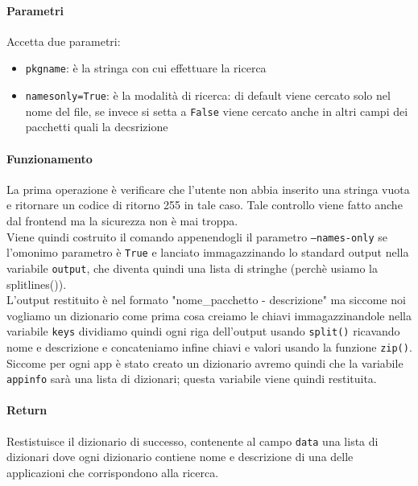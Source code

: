 \documentclass[11pt]{article}
\begin{document}
\paragraph{Parametri}
Accetta due parametri:
\begin{itemize}
	\item{\texttt{pkgname}: è la stringa con cui effettuare la ricerca}
	\item{\texttt{namesonly=True}: è la modalità di ricerca: di default viene cercato solo nel
		nome del file, se invece si setta a \texttt{False} viene cercato anche in altri campi
		dei pacchetti quali la decsrizione}
\end{itemize}
\paragraph{Funzionamento}
La prima operazione è verificare che l'utente non abbia inserito una stringa vuota e ritornare un codice di ritorno 255
in tale caso. Tale controllo viene fatto anche dal frontend ma la sicurezza non è mai troppa.\\
Viene quindi costruito il comando appenendogli il parametro \texttt{--names-only} se l'omonimo parametro è \texttt{True}
e lanciato immagazzinando lo standard output nella variabile \texttt{output}, che diventa quindi una lista di stringhe
(perchè usiamo la splitlines()).\\
L'output restituito è nel formato "nome\_pacchetto - descrizione" ma siccome noi vogliamo un dizionario come prima cosa
creiamo le chiavi immagazzinandole nella variabile \texttt{keys} dividiamo quindi ogni riga dell'output usando \texttt{split()}
ricavando nome e descrizione e concateniamo infine chiavi e valori usando la funzione \texttt{zip()}. Siccome per ogni app
è stato creato un dizionario avremo quindi che la variabile \texttt{appinfo} sarà una lista di dizionari; questa variabile
viene quindi restituita.
\paragraph{Return}
Restistuisce il dizionario di successo, contenente al campo \texttt{data} una lista di dizionari dove ogni dizionario contiene
nome e descrizione di una delle applicazioni che corrispondono alla ricerca.
\end{document}
